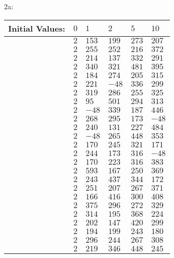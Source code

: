 \documentclass[12pt]{article}
\begin{document}
2a:
\begin{table}[]
\centering
\begin{tabular}{|l|l|l|l|l|l|}
\hline
Initial Values: & $0$ & $1$   & $2$   & $5$   & $10$  \\ \hline
                & $2$ & $153$ & $199$ & $273$ & $207$ \\
                & $2$ & $255$ & $252$ & $216$ & $372$ \\
                & $2$ & $214$ & $137$ & $332$ & $291$ \\
                & $2$ & $340$ & $321$ & $481$ & $395$ \\
                & $2$ & $184$ & $274$ & $205$ & $315$ \\
                & $2$ & $221$ & $-48$ & $336$ & $299$ \\
                & $2$ & $319$ & $286$ & $255$ & $325$ \\
                & $2$ & $95$  & $501$ & $294$ & $313$ \\
                & $2$ & $-48$ & $339$ & $187$ & $446$ \\
                & $2$ & $268$ & $295$ & $173$ & $-48$ \\
                & $2$ & $240$ & $131$ & $227$ & $484$ \\
                & $2$ & $-48$ & $265$ & $448$ & $353$ \\
                & $2$ & $170$ & $245$ & $321$ & $171$ \\
                & $2$ & $244$ & $173$ & $316$ & $-48$ \\
                & $2$ & $170$ & $223$ & $316$ & $383$ \\
                & $2$ & $593$ & $167$ & $250$ & $369$ \\
                & $2$ & $243$ & $437$ & $344$ & $172$ \\
                & $2$ & $251$ & $207$ & $267$ & $371$ \\
                & $2$ & $166$ & $416$ & $300$ & $408$ \\
                & $2$ & $375$ & $296$ & $272$ & $329$ \\
                & $2$ & $314$ & $195$ & $368$ & $224$ \\
                & $2$ & $202$ & $147$ & $420$ & $299$ \\
                & $2$ & $194$ & $199$ & $243$ & $180$ \\
                & $2$ & $296$ & $244$ & $267$ & $308$ \\
                & $2$ & $219$ & $346$ & $448$ & $245$ \\

\end{tabular}
\end{table}
\end{document}
